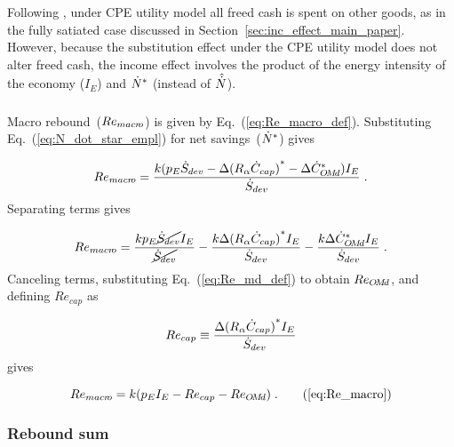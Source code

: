 Following \citet{Borenstein:2015aa},
under CPE utility model
all freed cash is spent on other goods,
as in the fully satiated case discussed
in Section~\ref{sec:inc_effect_main_paper}.
However, because the substitution effect
under the CPE utility model
does not alter freed cash,
the income effect
involves the product of
the energy intensity of the economy ($I_E$)
and ${\dot{N}}^*$
(instead of $\hat{\dot{N}}$).


\subsubsection{\Macroeffect{}}
\label{sec:Re_macro}

Macro rebound~($Re_{macr\!o}$) is given by Eq.~(\ref{eq:Re_macro_def}).
Substituting Eq.~(\ref{eq:N_dot_star_empl}) for net savings~(${\dot{N}}^*$) gives

\begin{equation}
  Re_{macr\!o} = \frac{k (p_E \dot{S}_{dev} - \Delta {(R_\alpha \dot{C}_{cap})}^* - \Delta {\dot{C}}^*_{O\!M\!d}) I_E}{\dot{S}_{dev}} \; .
\end{equation}
%
Separating terms gives

\begin{equation}
  Re_{macr\!o} = \frac{k p_E \cancel{\dot{S}_{dev}} I_E}{\cancel{\dot{S}_{dev}}}
                                - \frac{k \Delta {(R_\alpha  \dot{C}_{cap})}^* I_E}{\dot{S}_{dev}}
                                - \frac{k \Delta {\dot{C}}^*_{O\!M\!d} I_E}{\dot{S}_{dev}} \; .
\end{equation}
%
Canceling terms, substituting Eq.~(\ref{eq:Re_md_def}) to obtain $Re_{O\!M\!d}$, and
defining $Re_{cap}$ as

\begin{equation} \label{eq:Re_cap}
  Re_{cap} \equiv \frac{\Delta {(R_\alpha \dot{C}_{cap})}^* I_E}{\dot{S}_{dev}}{}
\end{equation}
%
gives

\begin{equation}
  Re_{\macro} = \Remacroeqn{} \; . \tag{\ref{eq:Re_macro}}
\end{equation}


\subsubsection{Rebound sum}
\label{sec:total_rebound}

